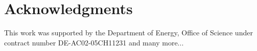 \documentclass[12pt,prd]{article}
\begin{document}
\section*{\label{sec::acknowledgments}Acknowledgments}

This work was supported by the Department of Energy, Office of Science under contract number DE-AC02-05CH11231 and many more...



\end{document}
